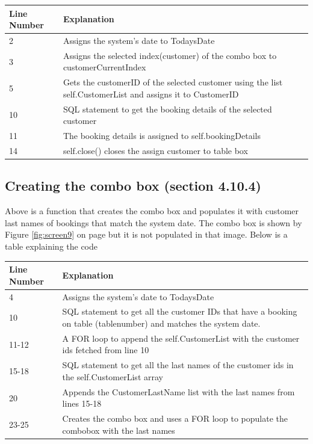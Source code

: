 \begin{center}
\begin{tabular}{|p{5cm}|p{7.5cm}|}
\hline
\textbf{Line Number} & \textbf{Explanation} \\ \hline
2 & Assigns the system's date to TodaysDate \\ \hline
3 & Assigns the selected index(customer) of the combo box to customerCurrentIndex \\ \hline
5 & Gets the customerID of the selected customer using the list self.CustomerList and assigns it to CustomerID \\ \hline
10 & SQL statement to get the booking details of the selected customer  \\ \hline
11 & The booking details is assigned to self.bookingDetails \\ \hline
14 & self.close() closes the assign customer to table box \\ \hline

\end{tabular}
\end{center}
\newpage
\subsection{Creating the combo box (section 4.10.4)}

Above is a function that creates the combo box and populates it with customer last names of bookings that match the system date. The combo box is shown by Figure \ref{fig:screen9} on page \pageref{fig:screen9} but it is not populated in that image. Below is a table explaining the code

\begin{center}
\begin{tabular}{|p{5cm}|p{7.5cm}|}
\hline
\textbf{Line Number} & \textbf{Explanation} \\ \hline
4 & Assigns the system's date to TodaysDate \\ \hline
10 & SQL statement to get all the customer IDs that have a booking on table (tablenumber) and matches the system date.  \\ \hline
11-12 & A FOR loop to append the self.CustomerList with the customer ids fetched from line 10 \\ \hline
15-18 & SQL statement to get all the last names of the customer ids in the self.CustomerList array \\ \hline
20 & Appends the CustomerLastName list with the last names from lines 15-18 \\ \hline
23-25 & Creates the combo box and uses a FOR loop to populate the combobox with the last names \\ \hline

\end{tabular}
\end{center}

